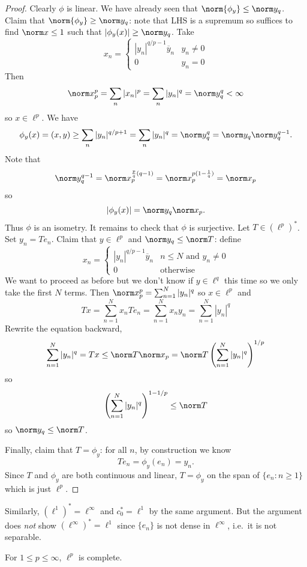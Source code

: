 \documentclass[a4paper]{article}
\begin{document}
\begin{proof}
  Clearly \(\phi\) is linear. We have already seen that \(\norm{\phi_y} \leq \norm y_q\). Claim that \(\norm{\phi_y} \geq \norm y_q\): note that LHS is a supremum so suffices to find \(\norm x \leq 1\) such that \(|\phi_y(x)| \geq \norm y_q\). Take
  \[
    x_n =
    \begin{cases}
      |y_n|^{q/p - 1} \overline y_n & y_n \neq 0 \\
      0 & y_n = 0
    \end{cases}
  \]
  Then
  \[
    \norm x_p^p = \sum_n |x_n|^p = \sum_n |y_n|^q = \norm y_q^q < \infty
  \]
  so \(x \in \ell^p\). We have
  \[
    \phi_y(x) = (x, y) \geq \sum_{n} |y_n|^{q/p + 1} = \sum_n |y_n|^q = \norm y_q^q = \norm y_q \norm y_q^{q - 1}.
  \]
  Note that
  \[
    \norm y_q^{q - 1} = \norm x_p^{\frac{p}{q}(q - 1)} = \norm x_p^{p (1 - \frac{1}{q})} = \norm x_p
  \]
  so
  \[
    |\phi_y(x)| = \norm y_q \norm x_p.
  \]
  Thus \(\phi\) is an isometry. It remains to check that \(\phi\) is surjective. Let \(T \in (\ell^p)^*\). Set \(y_n = Te_n\). Claim that \(y \in \ell^p\) and \(\norm y_q \leq \norm T\): define
  \[
    x_n =
    \begin{cases}
      |y_n|^{q/p - 1} \overline y_n & n \leq N \text{ and } y_n \neq 0 \\
      0 & \text{otherwise}
    \end{cases}
  \]
  We want to proceed as before but we don't know if \(y \in \ell^q\) this time so we only take the first \(N\) terms. Then \(\norm x_p^p = \sum_{n = 1}^N |y_n|^q\) so \(x \in \ell^p\) and
  \[
     Tx
    = \sum_{n = 1}^N x_n Te_n
    = \sum_{n = 1}^N x_n y_n
    = \sum_{n = 1}^N |y_n|^q
  \]
  Rewrite the equation backward,
  \[
    \sum_{n = 1}^N |y_n|^q
    = Tx
    \leq \norm T \norm x_p
    = \norm T \left( \sum_{n = 1}^N |y_n|^q \right)^{1/p}
  \]
  so
  \[
    \left( \sum_{n = 1}^N |y_n|^q \right)^{1 - 1/p} \leq \norm T
  \]
  so \(\norm y_q \leq \norm T\).

  Finally, claim that \(T = \phi_y\): for all \(n\), by construction we know
  \[
    Te_n = \phi_y(e_n) = y_n.
  \]
  Since \(T\) and \(\phi_y\) are both continuous and linear, \(T = \phi_y\) on the span of \(\{e_n: n \geq 1\}\) which is just \(\ell^p\).
\end{proof}

\begin{remark}
  Similarly, \((\ell^1)^* = \ell^\infty\) and \(c_0^* = \ell^1\) by the same argument. But the argument does \emph{not} show \((\ell^\infty)^* = \ell^1\) since \(\{e_n\}\) is not dense in \(\ell^\infty\), i.e.\ it is not separable.
\end{remark}

\begin{corollary}
  For \(1 \leq p \leq \infty\), \(\ell^p\) is complete.
\end{corollary}










\printindex
\end{document}
